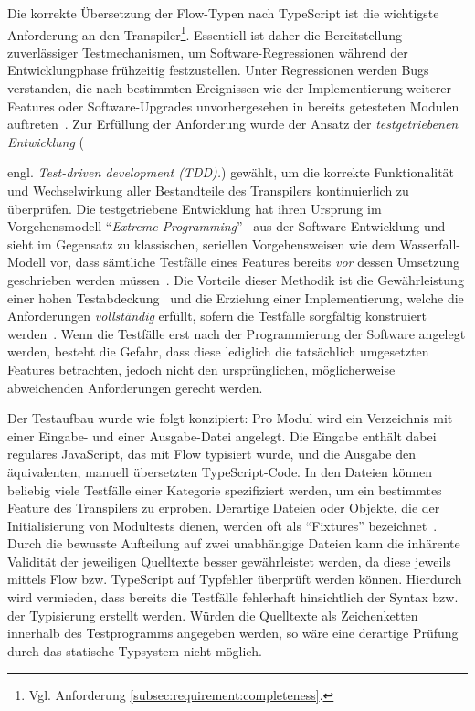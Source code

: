 Die korrekte Übersetzung der Flow-Typen nach TypeScript ist die wichtigste Anforderung an den Transpiler\footnote{Vgl. Anforderung \ref{subsec:requirement:completeness}.}. Essentiell ist daher die Bereitstellung zuverlässiger Testmechanismen, um Software-Regressionen während der Entwicklungphase frühzeitig festzustellen. Unter Regressionen werden Bugs verstanden, die nach bestimmten Ereignissen wie der Implementierung weiterer Features oder Software-Upgrades unvorhergesehen in bereits getesteten Modulen auftreten~\autocite[218]{DOR:SOFTWARE_TEST}. Zur Erfüllung der Anforderung wurde der Ansatz der \emph{testgetriebenen Entwicklung} ({engl. \textit{Test-driven development (TDD).}) gewählt, um die korrekte Funktionalität und Wechselwirkung aller Bestandteile des Transpilers kontinuierlich zu überprüfen. Die testgetriebene Entwicklung hat ihren Ursprung im Vorgehensmodell \enquote{\textit{Extreme Programming}}~\autocite{JEFFRIES:EXTREME_PROGRAMMING} aus der Software-Entwicklung und sieht im Gegensatz zu klassischen, seriellen Vorgehensweisen wie dem Wasserfall-Modell vor, dass sämtliche Testfälle eines Features bereits \emph{vor} dessen Umsetzung geschrieben werden müssen~\autocite{BECK:EXTREME_PROGRAMMING}. Die Vorteile dieser Methodik ist die Gewährleistung einer hohen Testabdeckung~\autocite[90]{BECK:TDD} und die Erzielung einer Implementierung, welche die Anforderungen \emph{vollständig} erfüllt, sofern die Testfälle sorgfältig konstruiert werden~\autocite[214]{BECK:TDD}. Wenn die Testfälle erst nach der Programmierung der Software angelegt werden, besteht die Gefahr, dass diese lediglich die tatsächlich umgesetzten Features betrachten, jedoch nicht den ursprünglichen, möglicherweise abweichenden Anforderungen gerecht werden.

Der Testaufbau wurde wie folgt konzipiert: Pro Modul wird ein Verzeichnis mit einer Ein\-gabe- und einer Ausgabe-Datei angelegt. Die Eingabe enthält dabei reguläres JavaScript, das mit Flow typisiert wurde, und die Ausgabe den äquivalenten, manuell übersetzten TypeScript-Code. In den Dateien können beliebig viele Testfälle einer Kategorie spezifiziert werden, um ein bestimmtes Feature des Transpilers zu erproben. Derartige Dateien oder Objekte, die der Initialisierung von Modultests dienen, werden oft als \enquote{Fixtures} bezeichnet~\autocite{OLAN:2003}. Durch die bewusste Aufteilung auf zwei unabhängige Dateien kann die inhärente Validität der jeweiligen Quelltexte besser gewährleistet werden, da diese jeweils mittels Flow bzw. TypeScript auf Typfehler überprüft werden können. Hierdurch wird vermieden, dass bereits die Testfälle fehlerhaft hinsichtlich der Syntax bzw. der Typisierung erstellt werden. Würden die Quelltexte als Zeichenketten innerhalb des Testprogramms angegeben werden, so wäre eine derartige Prüfung durch das statische Typsystem nicht möglich.

}
